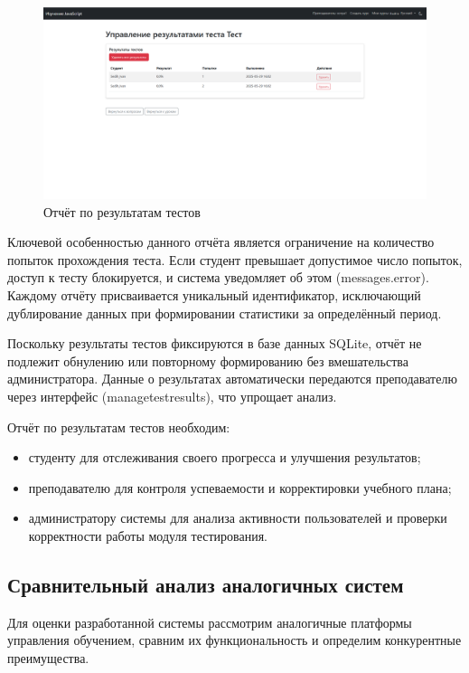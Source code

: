 \begin{figure}[ht]
	\centering
	\includegraphics[width=1\linewidth]{images/резы} 
	\caption{Отчёт по результатам тестов}
	\label{zotchet:image}
\end{figure}

Ключевой особенностью данного отчёта является ограничение на количество попыток прохождения теста. Если студент превышает допустимое число попыток, доступ к тесту блокируется, и система уведомляет об этом (messages.error). Каждому отчёту присваивается уникальный идентификатор, исключающий дублирование данных при формировании статистики за определённый период.

Поскольку результаты тестов фиксируются в базе данных SQLite, отчёт не подлежит обнулению или повторному формированию без вмешательства администратора. Данные о результатах автоматически передаются преподавателю через интерфейс (managetestresults), что упрощает анализ. 

Отчёт по результатам тестов необходим: 

\begin{itemize}
	\item студенту для отслеживания своего прогресса и улучшения результатов; 
	\item преподавателю для контроля успеваемости и корректировки учебного плана; 
	\item администратору системы для анализа активности пользователей и проверки корректности работы модуля тестирования.
\end{itemize}

\subsection{Сравнительный анализ аналогичных систем}

Для оценки разработанной системы рассмотрим аналогичные платформы управления обучением, сравним их функциональность и определим конкурентные преимущества.

